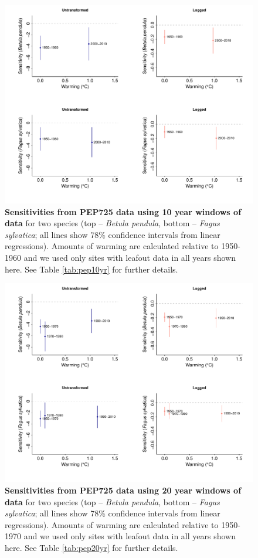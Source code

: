 \documentclass[11pt]{article}
\begin{document}
\clearpage
\begin{figure}[h!]
\centering
\noindent \includegraphics[width=1\textwidth]{..//analyses/figures/basicpep195020102spp4paneladj.pdf}
\caption{\textbf{Sensitivities from PEP725 data using 10 year windows of data} for two species (top -- \emph{Betula pendula}, bottom -- \emph{Fagus sylvatica}; all lines show 78\% confidence intervals from linear regressions). Amounts of warming are calculated relative to 1950-1960 and we used only sites with leafout data in all years shown here. See Table \ref{tab:pep10yr} for further details. }
\label{fig:pepper10yr} %
\end{figure}

\clearpage
\begin{figure}[h!]
\centering
\noindent \includegraphics[width=1\textwidth]{..//analyses/figures/basicpep1950to20002spp4paneladj.pdf}
\caption{\textbf{Sensitivities from PEP725 data using 20 year windows of data} for two species (top -- \emph{Betula pendula}, bottom -- \emph{Fagus sylvatica}; all lines show 78\% confidence intervals from linear regressions). Amounts of warming are calculated relative to 1950-1970 and we used only sites with leafout data in all years shown here. See Table \ref{tab:pep20yr} for further details. }
\label{fig:pepper20yr} %
\end{figure}
\end{document}
